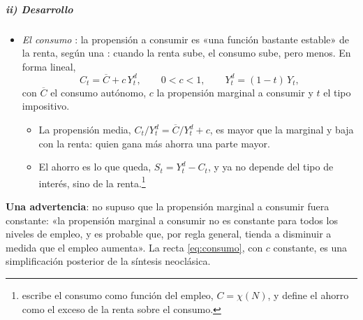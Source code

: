 \documentclass[11pt]{article}
\begin{document}
\subparagraph{ii) Desarrollo}

\begin{itemize}
\item \emph{El consumo} : la propensión a consumir es «una función bastante estable» de la renta\nocite{Keynes1936}, según una : cuando la renta sube, el consumo sube, pero menos\nocite{Keynes1936}. En forma lineal,
  \begin{equation}
  C_t=\overline{C}+c\,Y^d_t,\qquad 0<c<1,\qquad Y^d_t=(1-t)\,Y_t, \label{eq:consumo}
  \end{equation}
  con $\overline{C}$ el consumo autónomo, $c$ la propensión marginal a consumir y $t$ el tipo impositivo.
  \begin{itemize}
  \item La propensión media, $C_t/Y^d_t=\overline{C}/Y^d_t+c$, es mayor que la marginal y baja con la renta: quien gana más ahorra una parte mayor.
  \item El ahorro es lo que queda, $S_t=Y^d_t-C_t$, y ya no depende del tipo de interés, sino de la renta.\footnote{ escribe el consumo como función del empleo, $C=\chi(N)$, y define el ahorro como el exceso de la renta sobre el consumo\nocite{Keynes1936}.}
  \end{itemize}
\end{itemize}

\begin{anotaciones}
\textbf{Una advertencia}:  no supuso que la propensión marginal a consumir fuera constante: «la propensión marginal a consumir no es constante para todos los niveles de empleo, y es probable que, por regla general, tienda a disminuir a medida que el empleo aumenta»\nocite{Keynes1936}. La recta \eqref{eq:consumo}, con $c$ constante, es una simplificación posterior de la síntesis neoclásica.
\end{anotaciones}
\end{document}
